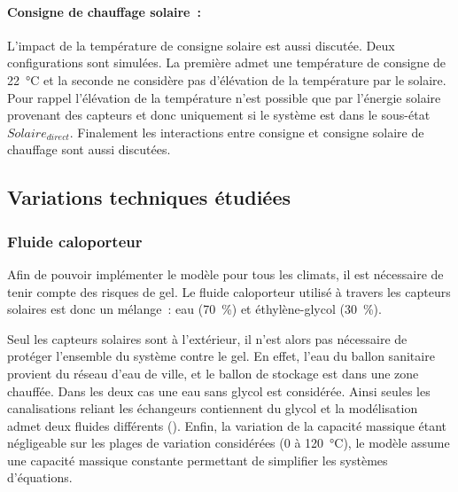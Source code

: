 \paragraph{Consigne de chauffage solaire~:} %
\label{par:consigne_de_chauffage_solaire}
L’impact de la température de consigne solaire est aussi discutée. Deux configurations sont
simulées. La première admet une température de consigne de \SI{22}{\celsius} et la seconde
ne considère pas d’élévation de la température par le solaire. Pour rappel l’élévation de
la température n’est possible que par l’énergie solaire provenant des capteurs et donc
uniquement si le système est dans le sous-état $Solaire_{direct}$. Finalement les interactions
entre consigne et consigne solaire de chauffage sont aussi discutées.


\subsection{Variations techniques étudiées} %
\label{sub:variations_techniques_etudiees}
\subsubsection{Fluide caloporteur} %
\label{ssub:fluide_caloporteur}
Afin de pouvoir implémenter le modèle pour tous les climats, il est nécessaire de
tenir compte des risques de gel. Le fluide caloporteur utilisé à travers les capteurs
solaires est donc un mélange~: eau (\SI{70}{\percent}) et éthylène-glycol (\SI{30}{\percent}).

Seul les capteurs solaires sont à l’extérieur, il n’est alors pas nécessaire de protéger
l’ensemble du système contre le gel. En effet, l’eau du ballon sanitaire provient du
réseau d’eau de ville, et le ballon de stockage est dans une zone chauffée. Dans les
deux cas une eau sans glycol est considérée. Ainsi seules les canalisations reliant les
échangeurs contiennent du glycol et la modélisation admet deux fluides différents
(). Enfin, la variation de la capacité massique étant négligeable sur
les plages de variation considérées (\num{0} à \SI{120}{\celsius}), le modèle assume une
capacité massique constante permettant de simplifier les systèmes d’équations.

